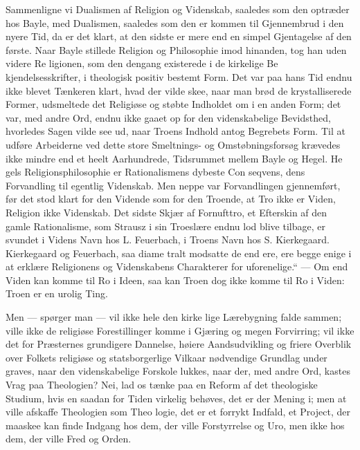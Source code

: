 \documentclass[12pt]{book}
\newcommand{\opage}[1]{\marginnote{\footnotesize\textit{[#1]}}}
\begin{document}
Sammenligne vi Dualismen af Religion og Videnskab,
saaledes som den optræder hos Bayle, med Dualismen,
saaledes som den er kommen til Gjennembrud i den nyere
Tid, da er det klart, at den sidste er mere end en simpel
Gjentagelse af den første. Naar Bayle stillede Religion
og Philosophie imod hinanden, tog han uden videre Re\-%
\opage{273}\setcounter{footnote}{0}%
ligionen, som den dengang existerede i de kirkelige Be\-%
kjendelsesskrifter, i theologisk positiv bestemt Form. Det
var paa hans Tid endnu ikke blevet Tænkeren klart, hvad
der vilde skee, naar man brød de krystalliserede Former,
udsmeltede det Religiøse og støbte Indholdet om i en
anden Form; det var, med andre Ord, endnu ikke gaaet
op for den videnskabelige Bevidsthed, hvorledes Sagen
vilde see ud, naar Troens Indhold antog Begrebets Form.
Til at udføre Arbeiderne ved dette store Smeltnings- og
Omstøbningsforsøg krævedes ikke mindre end et heelt
Aarhundrede, Tidsrummet mellem Bayle og Hegel. He\-%
gels Religionsphilosophie er Rationalismens dybeste Con\-%
seqvens, dens Forvandling til egentlig Videnskab. Men
neppe var Forvandlingen gjennemført, før det stod klart
for den Vidende som for den Troende, at Tro ikke er
Viden, Religion ikke Videnskab. Det sidste Skjær af
Fornufttro, et Efterskin af den gamle Rationalisme, som
Strausz i sin Troeslære endnu lod blive tilbage, er svundet
i Videns Navn hos L. Feuerbach, i Troens Navn hos
S. Kierkegaard. Kierkegaard og Feuerbach, saa diame\-%
tralt modsatte de end ere, ere begge enige i at erklære
Religionens og Videnskabens Charakterer for uforenelige.“
--- Om end Viden kan komme til Ro i Ideen, saa kan
Troen dog ikke komme til Ro i Viden: Troen er en
urolig Ting.

Men --- spørger man --- vil ikke hele den kirke\-%
lige Lærebygning falde sammen; ville ikke de religiøse
Forestillinger komme i Gjæring og megen Forvirring;
vil ikke det for Præsternes grundigere Dannelse, høiere
Aandsudvikling og friere Overblik over Folkets religiøse
og statsborgerlige Vilkaar nødvendige Grundlag under\-%
graves, naar den videnskabelige Forskole lukkes, naar
der, med andre Ord, kastes Vrag paa Theologien? Nei,
lad os tænke paa en Reform af det theologiske Studium,
\opage{274}\setcounter{footnote}{0}%
hvis en saadan for Tiden virkelig behøves, det er der
Mening i; men at ville afskaffe Theologien som Theo\-%
logie, det er et forrykt Indfald, et Project, der maaskee
kan finde Indgang hos dem, der ville Forstyrrelse og Uro,
men ikke hos dem, der ville Fred og Orden.
\end{document}
